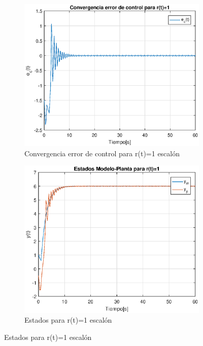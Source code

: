  \begin{figure}
  \begin{subfigure}[b]{0.4\textwidth}
    \includegraphics[width=\textwidth]{error_r1.eps}
    \caption{Convergencia error de control para r(t)=1 escalón}
    \label{fig:error_r1}
  \end{subfigure}
  \begin{subfigure}[b]{0.4\textwidth}
    \includegraphics[width=\textwidth]{estados_r1.eps}
    \caption{Estados para r(t)=1 escalón}
    \label{fig:est_r1}
  \end{subfigure}
\end{figure}

